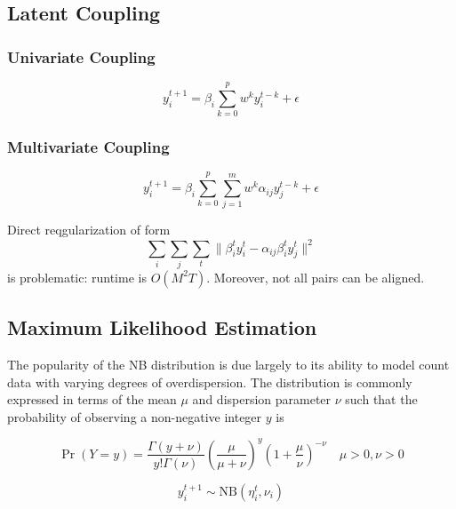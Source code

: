 \documentclass{article}
\begin{document}
\subsection{Latent Coupling}
\label{sec:org58a1c62}

\subsubsection{Univariate Coupling}
\label{sec:org45e30c6}
\begin{equation}
    y_i^{t+1} = \beta_i \sum_{k=0}^p w^k y_i^{t-k} + \epsilon
\end{equation}

\subsubsection{Multivariate Coupling}
\label{sec:orgb89969b}
\begin{equation}
    y_i^{t+1} = \beta_i \sum_{k=0}^p \sum_{j=1}^m w^k \alpha_{ij} y_j^{t-k} + \epsilon
\end{equation}

Direct reqgularization of form
\begin{equation*}
    \sum_i\sum_j\sum_t\|\beta_i^t y_i^t - \alpha_{ij}\beta_i^t y_j^t\|^2
\end{equation*}
is problematic: runtime is \(O(M^2T)\). Moreover, not all pairs can be aligned.



\subsection{Maximum Likelihood Estimation}
\label{sec:org8d2991e}
The popularity of the NB distribution is due largely to its ability to model
count data with varying degrees of overdispersion. The distribution is commonly
expressed in terms of the mean \(\mu\) and dispersion parameter \(\nu\) such that the
probability of observing a non-negative integer \(y\) is

\begin{equation*}
\Pr(Y = y) = \frac{\Gamma(y + \nu)}{y!\Gamma(\nu)}\left(\frac{\mu}{\mu +\nu}\right)^{y}\left(1 + \frac{\mu}{\nu}\right)^{-\nu}
\quad \mu > 0, \nu > 0
\end{equation*}

\begin{equation*}
    y^{t+1}_{i} \sim \text{NB}(\eta_i^{t}, \nu_i)
\end{equation*}
\end{document}
